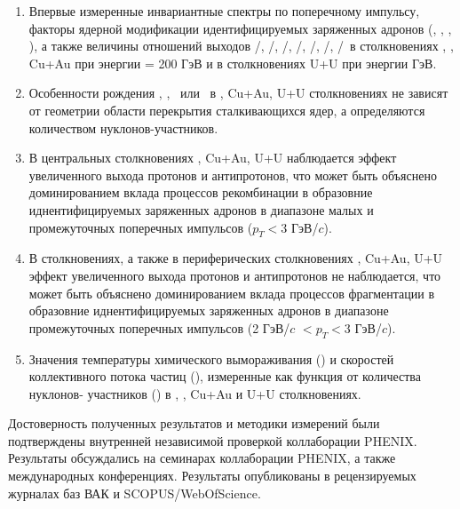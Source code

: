 {}
\begin{enumerate}[beginpenalty=10000] %
	\item Впервые измеренные инвариантные спектры по поперечному импульсу, факторы ядерной модификации идентифицируемых заряженных адронов (\pipm, \Kpm, \prot, \aprot), а также величины отношений выходов \pim/\pip, \Km/\Kp, \prot/\aprot, \prot/\pip, \aprot/\pim, \Kp/\pip, \Km/\pim \ в столкновениях  \pal, \heau, Cu+Au при энергии \sqsn = 200 ГэВ и в столкновениях U+U при энергии  ГэВ. 

	\item Особенности рождения \pipm, \Kpm, \prot \ или \aprot \ в \heau, Cu+Au, U+U  столкновениях не зависят от геометрии области перекрытия сталкивающихся ядер, а определяются количеством нуклонов-участников.
	
	\item В центральных столкновениях \heau, Cu+Au, U+U наблюдается эффект увеличенного выхода протонов и антипротонов, что может быть объяснено доминированием вклада процессов рекомбинации в образовние иднентифицируемых заряженных адронов в диапазоне малых и промежуточных поперечных импульсов ($p_{T}<3$ ГэВ/$c$). 
	
	\item В \pal столкновениях, а также в периферических столкновениях \heau, Cu+Au, U+U эффект увеличенного выхода протонов и антипротонов не наблюдается, что может быть объяснено доминированием вклада процессов фрагментации в образовние иднентифицируемых заряженных адронов в диапазоне промежуточных поперечных импульсов (2 ГэВ/$c$ $<p_{T}<3$ ГэВ/$c$).
	
	\item Значения температуры химического вымораживания (\To) и скоростей коллективного потока частиц (\ut), измеренные как функция от количества нуклонов- участников (\Npart) в \pal, \heau, Cu+Au и U+U столкновениях.
\end{enumerate}

{\reliability} Достоверность полученных результатов и методики измерений были подтверждены внутренней независимой проверкой коллаборации PHENIX. Результаты обсуждались на семинарах коллаборации PHENIX, а также международных конференциях. Результаты опубликованы в рецензируемых журналах баз ВАК и SCOPUS/WebOfScience.


